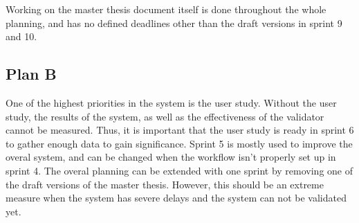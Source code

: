 \documentclass{../resources/acm_proc_article-sp}
\begin{document}
Working on the master thesis document itself is done throughout the whole planning, and has no defined deadlines other than the draft versions in sprint 9 and 10. 

\subsection{Plan B}

One of the highest priorities in the system is the user study. Without the user study, the results of the system, as well as the effectiveness of the validator cannot be measured. Thus, it is important that the user study is ready in sprint 6 to gather enough data to gain significance. Sprint 5 is mostly used to improve the overal system, and can be changed when the workflow isn't properly set up in sprint 4. The overal planning can be extended with one sprint by removing one of the draft versions of the master thesis. However, this should be an extreme measure when the system has severe delays and the system can not be validated yet.

\printbibliography

\balancecolumns
\end{document}
